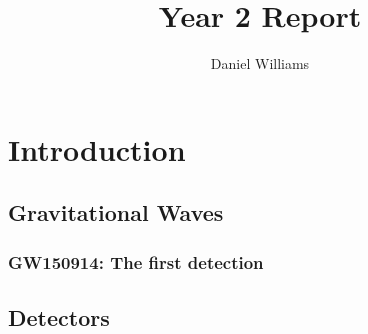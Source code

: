 \documentclass[openleft]{kentigern}
\title{Year 2 Report}
\author{Daniel Williams}
\theoremstyle{definition}
\begin{document}

\begin{titlepage}
\thispagestyle{empty}

\maketitle
\restoregeometry
\end{titlepage}

\newpage
%

\newpage
%


\part{Introduction}
\label{part:intro}


 \chapter{Gravitational Waves}
 \label{cha:grav-waves}


\chapterprecis{}

% 

\section{GW150914: The first detection}
\label{sec:gw150914:-first-dete}



 \chapter{Detectors}
 \label{cha:detectors}
\end{document}
